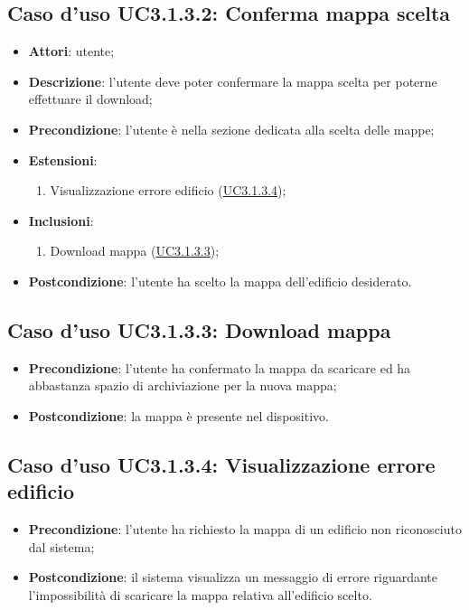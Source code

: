 \documentclass[../AnalisiDeiRequisiti.tex]{subfiles}
\begin{document}
\subsection{Caso d'uso UC3.1.3.2: Conferma mappa scelta}
\begin{itemize}
\item \textbf{Attori}: utente;
\item \textbf{Descrizione}: l'utente deve poter confermare la mappa scelta per poterne effettuare il download; 
      \item \textbf{Precondizione}: l'utente è nella sezione dedicata alla scelta delle mappe;
    \item \textbf{Estensioni}:
      \begin{enumerate}
          \item Visualizzazione errore edificio (\hyperlink{UC3.1.3.4}{UC3.1.3.4});

      \end{enumerate}
    \item \textbf{Inclusioni}:
      \begin{enumerate}
          \item Download mappa (\hyperlink{UC3.1.3.3}{UC3.1.3.3});

      \end{enumerate}
    \item \textbf{Postcondizione}: l'utente ha scelto la mappa dell'edificio desiderato.
  \end{itemize}
\hypertarget{UC3.1.3.3}{}
\subsection{Caso d'uso UC3.1.3.3: Download mappa}
\begin{itemize}
    \item \textbf{Precondizione}: l'utente ha confermato la mappa da scaricare ed ha abbastanza spazio di archiviazione per la nuova mappa;
    \item \textbf{Postcondizione}: la mappa è presente nel dispositivo.
  \end{itemize}
\hypertarget{UC3.1.3.4}{}
\subsection{Caso d'uso UC3.1.3.4: Visualizzazione errore edificio}
\begin{itemize}
    \item \textbf{Precondizione}: l'utente ha richiesto la mappa di un edificio non riconosciuto dal sistema;
    \item \textbf{Postcondizione}: il sistema visualizza un messaggio di errore riguardante l'impossibilità di scaricare la mappa relativa all'edificio scelto.
  \end{itemize}
\newpage
\hypertarget{UC3.2}{}
\end{document}
